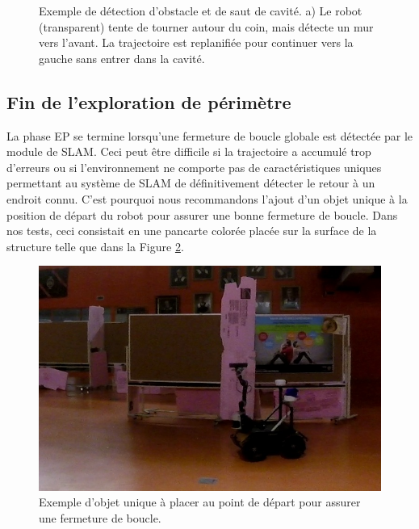 \begin{figure}[ht]
\centering
{}
\hfil
{}
\caption[Exemple de détection d'obstacle et de saut de cavité.]{
Exemple de détection d'obstacle et de saut de cavité. a) Le robot (transparent) tente de tourner autour du coin, mais détecte un mur vers l'avant. La trajectoire est replanifiée pour continuer vers la gauche sans entrer dans la cavité.}
\label{fig:ugv_exploration}
\end{figure}

\subsection{Fin de l'exploration de périmètre}

La phase EP se termine lorsqu'une fermeture de boucle globale est détectée par le module de SLAM. Ceci peut être difficile si la trajectoire a accumulé trop d'erreurs ou si l'environnement ne comporte pas de caractéristiques uniques permettant au système de SLAM de définitivement détecter le retour à un endroit connu. C'est pourquoi nous recommandons l'ajout d'un objet unique à la position de départ du robot pour assurer une bonne fermeture de boucle. Dans nos tests, ceci consistait en une pancarte colorée placée sur la surface de la structure telle que dans la Figure \ref{fig:ugv_pancarte}.

\begin{figure}[ht]
  \centering
  \includegraphics[width=0.5\linewidth]{images/ugv_unique.jpg}
  \caption{Exemple d'objet unique à placer au point de départ pour assurer une fermeture de boucle.}
  \label{fig:ugv_pancarte}
\end{figure}

